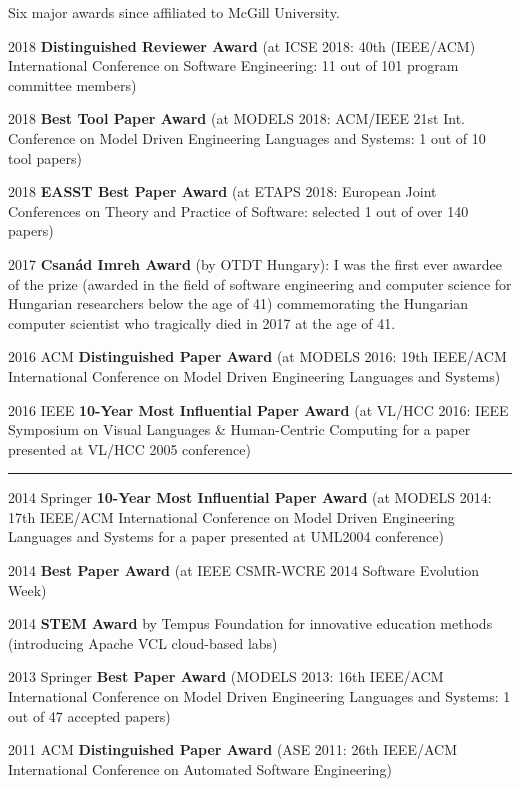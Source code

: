 Six major awards since affiliated to McGill University. 
\begin{yearlist}
\item[2018] \textbf{Distinguished Reviewer Award} (at ICSE 2018: 40th (IEEE/ACM) International Conference on Software Engineering: 11 out of 101 program committee members)
\item[2018] \textbf{Best Tool Paper Award} (at MODELS 2018: ACM/IEEE 21st Int. Conference on Model Driven Engineering Languages and Systems: 1 out of 10 tool papers)
\item[2018] \textbf{EASST Best Paper Award} (at ETAPS 2018: European Joint Conferences on Theory and Practice of Software: selected 1 out of over 140 papers)
\item[2017] \textbf{Csanád Imreh Award} (by OTDT Hungary): \newline I was the first ever awardee of the prize (awarded in the field of software engineering and computer science for Hungarian researchers below the age of 41) commemorating the Hungarian computer scientist who tragically died in 2017 at the age of 41.  
\item[2016] ACM \textbf{Distinguished Paper Award} (at MODELS 2016: 19th IEEE/ACM International Conference on Model Driven Engineering Languages and Systems) 
\item[2016] IEEE \textbf{10-Year Most Influential Paper Award} \newline (at VL/HCC 2016: IEEE Symposium on Visual Languages \& Human-Centric Computing for a paper presented at VL/HCC 2005 conference) 
\newline
\rule{\linewidth}{0.2mm}
\item[2014] Springer \textbf{10-Year Most Influential Paper Award} \newline (at MODELS 2014: 17th IEEE/ACM International Conference on Model Driven Engineering Languages and Systems for a paper presented at UML2004 conference) 
\item[2014] \textbf{Best Paper Award} (at IEEE CSMR-WCRE 2014 Software Evolution Week) 
\item[2014] \textbf{STEM Award} by Tempus Foundation for innovative education methods (introducing Apache VCL cloud-based labs)
\item[2013] Springer \textbf{Best Paper Award} (MODELS 2013: 16th IEEE/ACM International Conference on Model Driven Engineering Languages and Systems: 1 out of 47 accepted papers) 
\item[2011] ACM \textbf{Distinguished Paper Award} (ASE 2011: 26th IEEE/ACM International Conference on Automated Software Engineering) 

\end{yearlist}
